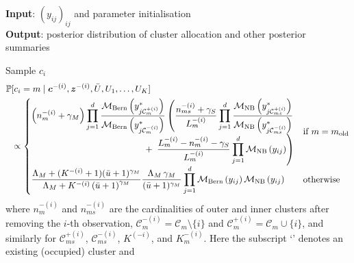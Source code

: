 \documentclass[11pt]{article}
\begin{document}
\begin{algorithm}[h!] 
\caption{\label{alg:marg}Marginal algorithm }
\hspace*{\algorithmicindent} \textbf{Input}: $\left(y_{ij}\right)_{ij}$ and parameter initialisation \\
\hspace*{\algorithmicindent} \textbf{Output}: posterior distribution of cluster allocation and other posterior summaries\\
\begin{algorithmic}
	\State Sample $c_i$ 
	\small
	\[
	\begin{aligned}
		\mathbb{P}&[c_i = m \mid \bm{c}^{-(i)}, \bm{z}^{-(i)}, \bar U, U_1, \ldots, U_K] \\
		&\propto\begin{cases}
			\begin{aligned}
				\left(n_m^{-(i)} + \gamma_M\right)\prod_{j=1}^d \frac{\mathcal{M}_\mathrm{Bern}\left(y^*_{j\mathcal{C}_m^{+(i)}}\right) }{\mathcal{M}_\mathrm{Bern}\left(y^*_{j\mathcal{C}_m^{-(i)}}\right)}\left(\frac{n_{ms}^{-(i)} + \gamma_S}{L^{-(i)}_m}
				\prod_{j=1}^d \frac{\mathcal{M}_\mathrm{NB}\left(y^*_{j\mathcal{C}_{ms}^{+(i)}} \right) 
				}{\mathcal{M}_\mathrm{NB}\left(y^*_{j\mathcal{C}_{ms}^{-(i)}} \right)}\right. \\
				\left. + \enskip \frac{L^{-(i)}_m - n^{-(i)}_m - \gamma_S}{L^{-(i)}_m} \prod_{j=1}^d \mathcal{M}_\mathrm{NB}\left(y_{ij}\right)\right)
			\end{aligned}& \text{if } m = m_\textnormal{old}\\
			\begin{aligned}
				\frac{\Lambda_M + (K^{-(i)} + 1)(\bar{u} + 1)^{\gamma_M}}{\Lambda_M + K^{-(i)}\left(\bar{u} + 1\right)^{\gamma_M}}\frac{\Lambda_M \, \gamma_M}{(\bar{u}+1)^{\gamma_M}}
				\prod_{j=1}^d\mathcal{M}_\mathrm{Bern}\left(y_{ij}\right)\mathcal{M}_\mathrm{NB}\left(y_{ij}\right)\end{aligned} & \text{otherwise }\\
		\end{cases}
	\end{aligned}
	\]
	\normalsize
	\indent where $n_m^{-(i)}$ and $n_{ms}^{-(i)}$ are the cardinalities of outer and inner clusters after removing the $i$-th observation, $\mathcal{C}_m^{-(i)} = \mathcal{C}_m \setminus \{i\} $ and  $\mathcal{C}_m^{+(i)} = \mathcal{C}_m \cup  \{i\}$, and similarly for  $\mathcal{C}_{ms}^{+(i)}$, $\mathcal{C}_{ms}^{-(i)}$, $K^{(-i)}$, and $K_m^{-(i)}$. Here the subscript `' denotes an existing (occupied) cluster and

\end{algorithmic}
\end{algorithm}
\end{document}
